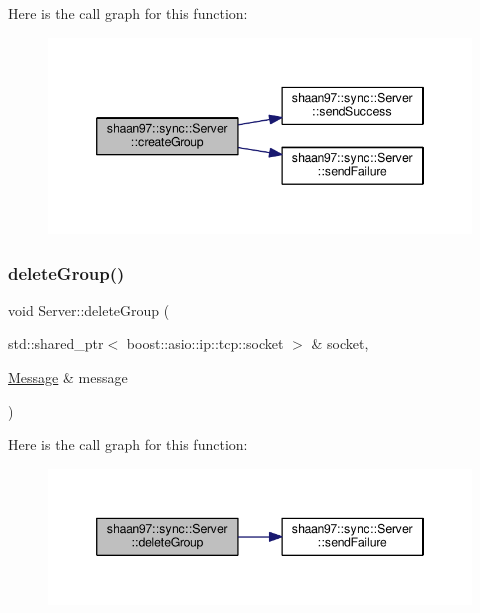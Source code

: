Here is the call graph for this function\+:\nopagebreak
\begin{figure}[H]
\begin{center}
\leavevmode
\includegraphics[width=346pt]{group___message_handling_ga81c419040ae028471a5737c4c0c50e3f_cgraph}
\end{center}
\end{figure}
\mbox{\label{group___message_handling_gaedbdfea1f476a81e5f1ff3b632db9bad}} 
\subsubsection{\texorpdfstring{delete\+Group()}{deleteGroup()}}
{\footnotesize\ttfamily void Server\+::delete\+Group (\begin{DoxyParamCaption}\item[{std\+::shared\+\_\+ptr$<$ boost\+::asio\+::ip\+::tcp\+::socket $>$ \&}]{socket,  }\item[{\hyperlink{structshaan97_1_1sync_1_1_message}{Message} \&}]{message }\end{DoxyParamCaption})\hspace{0.3cm}{\ttfamily [private]}}

Here is the call graph for this function\+:\nopagebreak
\begin{figure}[H]
\begin{center}
\leavevmode
\includegraphics[width=346pt]{group___message_handling_gaedbdfea1f476a81e5f1ff3b632db9bad_cgraph}
\end{center}
\end{figure}
\mbox{\label{group___message_handling_ga56230c5225416d342206232d3f2b8f6e}} 
